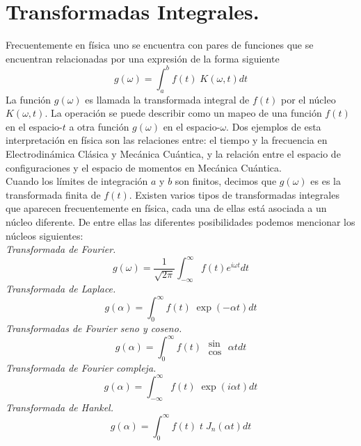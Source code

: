 \section{Transformadas Integrales.}
Frecuentemente en física uno se encuentra con pares de funciones que se encuentran relacionadas por una expresión de la forma siguiente
\begin{equation}
g(\omega) = \int_{a}^{b} f(t) \; K(\omega,t) dt
\label{eq:ecuacion7_01}
\end{equation}
La función $g(\omega)$ es llamada la transformada integral de $f(t)$ por el núcleo  $K(\omega,t)$. La operación se puede describir como un mapeo de una función $f(t)$ en el espacio-$t$ a otra función $g(\omega)$ en el espacio-$\omega$. Dos ejemplos de esta interpretación en física son las relaciones entre: el tiempo y la frecuencia en Electrodinámica Clásica y Mecánica Cuántica, y la relación entre el espacio de configuraciones y el espacio de momentos en Mecánica Cuántica.
\\
Cuando los límites de integración $a$ y $b$ son finitos, decimos que $g(\omega)$ es es la transformada finita de $f(t)$. Existen varios tipos de transformadas integrales que aparecen frecuentemente en física, cada una de ellas está asociada a un núcleo diferente. De entre ellas las diferentes posibilidades podemos mencionar los núcleos siguientes:
\\
\emph{Transformada de Fourier.}
\begin{equation}
g(\omega) = \dfrac{1}{\sqrt{2 \pi}} \int_{-\infty}^{\infty} f(t) e^{i \omega t} dt
\label{eq:ecuacion_07_01}
\end{equation}
\emph{Transformada de Laplace.}
\begin{equation}
g(\alpha)= \int_{0}^{\infty} f(t) \; \exp(-\alpha t) dt
\label{eq:ecuacion_7_02}
\end{equation}
\emph{Transformadas de Fourier seno y coseno.}
\begin{equation}
g(\alpha)= \int_{0}^{\infty} f(t) \; \substack{ \textstyle \sin \\ \textstyle \cos} \; \alpha t dt
\label{eq:ecuacion_7_03}
\end{equation}
\emph{Transformada de Fourier compleja.}
\begin{equation}
g(\alpha)= \int_{-\infty}^{\infty} f(t) \; \exp(i \alpha t) dt
\label{eq:ecuacion_7_04}
\end{equation}
\emph{Transformada de Hankel.}
\begin{equation}
g(\alpha)= \int_{0}^{\infty} f(t) \; t \; J_{n} (\alpha t) dt
\label{eq:ecuacion_7_05}
\end{equation}

